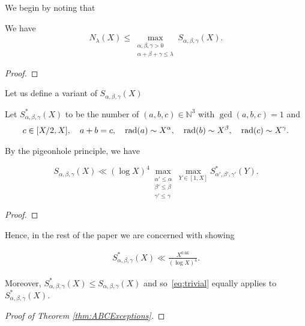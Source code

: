 We
 begin by noting that
\begin{lemma}\label{lem:NlambdatoSabc}
We have
\begin{equation}\label{eq:step1}
N_\lambda(X)\leq \max_{\substack{
\alpha,\beta,\gamma>0\\ \alpha+\beta+\gamma\leq \lambda}} S_{\alpha,\beta,\gamma}(X).
\end{equation}
\end{lemma}
\begin{proof}
\end{proof}
Let us define a variant of $S_{\alpha,\beta,\gamma}(X)$
\begin{definition}\label{def:Sstar}
  Let $S^*_{\alpha,\beta,\gamma}(X)$ to be the number of $(a,b,c)\in \mathbb{N}^3$ with $\gcd(a,b,c)=1$ and
  \begin{align*}
  c\in [X/2,X],\quad a+b=c,\quad \operatorname{rad}(a)\sim X^{\alpha},\quad \operatorname{rad}(b)\sim X^{\beta},\quad \operatorname{rad}(c)\sim X^{\gamma}.
  \end{align*}
\end{definition}


By the pigeonhole principle, we have

\begin{lemma}\label{lem:StoSstar}
\begin{equation}\label{eq:S->S*}
S_{\alpha,\beta,\gamma}(X)\ll (\log X)^4\max_{\substack{\alpha'\leq \alpha\\\beta'\leq \beta\\\gamma'\leq \gamma}}\max_{Y\in [1,X]}S^*_{\alpha',\beta',\gamma'}(Y).
\end{equation}
\end{lemma}
\begin{proof}
\end{proof}
Hence, in the rest of the paper we are concerned with showing

\begin{theorem}\label{thm:SstarExceptions}
\begin{align}\label{eq:S*}
S^{*}_{\alpha,\beta,\gamma}(X)\ll \frac{X^{0.66}}{(\log X)^4}.
\end{align}
\end{theorem}
Moreover, $S^*_{\alpha,\beta,\gamma}(X)\leq S_{\alpha,\beta,\gamma}(X)$ and so~\eqref{eq:trivial} equally applies to $S^*_{\alpha,\beta,\gamma}(X)$.

\begin{proof}[Proof of Theorem \ref{thm:ABCExceptions}]
  \end{proof}


